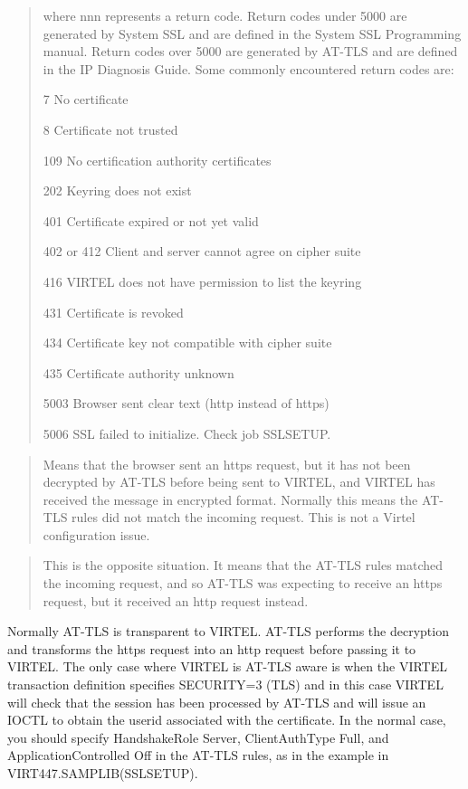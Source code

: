 \documentclass[letterpaper,10pt,english]{sphinxmanual}
\begin{document}
\begin{quote}

where nnn represents a return code. Return codes under 5000 are generated by System SSL and are defined in the System SSL Programming manual. Return codes over 5000 are generated by AT-TLS and are defined in the IP Diagnosis Guide. Some commonly encountered return codes are:

7   No certificate

8   Certificate not trusted

109 No certification authority certificates

202 Keyring does not exist

401 Certificate expired or not yet valid

402 or 412 Client and server cannot agree on cipher suite

416 VIRTEL does not have permission to list the keyring

431 Certificate is revoked

434 Certificate key not compatible with cipher suite

435 Certificate authority unknown

5003 Browser sent clear text (http instead of https)

5006 SSL failed to initialize. Check job SSLSETUP.
\end{quote}

\begin{quote}

Means that the browser sent an https request, but it has not been decrypted by AT-TLS before being sent to VIRTEL, and VIRTEL has received the message in encrypted format. Normally this means the AT-TLS rules did not match the incoming request. This is not a Virtel configuration issue.
\end{quote}

\begin{quote}

This is the opposite situation. It means that the AT-TLS rules matched the incoming request, and so AT-TLS was expecting to receive an https request, but it received an http request instead.
\end{quote}

Normally AT-TLS is transparent to VIRTEL. AT-TLS performs the decryption and transforms the https request into an http request before passing it to VIRTEL. The only case where VIRTEL is AT-TLS aware is when the VIRTEL transaction definition specifies SECURITY=3 (TLS) and in this case VIRTEL will check that the session has been processed by AT-TLS and will issue an IOCTL to obtain the userid associated with the certificate. In the normal case, you should specify HandshakeRole Server, ClientAuthType Full, and ApplicationControlled Off in the AT-TLS rules, as in the example in VIRT447.SAMPLIB(SSLSETUP).
\end{document}

